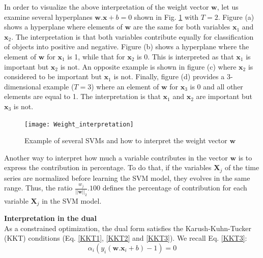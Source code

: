 In order to visualize the above interpretation of the weight vector $\textbf{w}$, let us examine several hyperplanes $\textbf{w}.\textbf{x}+b=0$ shown in Fig. \ref*{fig:Weight_interpretation} with $T=2$. Figure (a) shows a hyperplane where elements of $\textbf{w}$ are the same for both variables $\textbf{x}_1$ and $\textbf{x}_2$. The interpretation is that both variables contribute equally for classification of objects into positive and negative. Figure (b) shows a hyperplane where the element of $\textbf{w}$ for $\textbf{x}_1$ is 1, while that for $\textbf{x}_2$ is 0. This is interpreted as that $\textbf{x}_1$ is important but $\textbf{x}_2$ is not. An opposite example is shown in figure (c) where $\textbf{x}_2$ is considered to be important but $\textbf{x}_1$ is not. Finally, figure (d) provides a 3-dimensional example ($T=3$) where an element of $\textbf{w}$ for $\textbf{x}_3$ is 0 and all other elements are equal to 1. The interpretation is that $\textbf{x}_1$ and $\textbf{x}_2$ are important but $\textbf{x}_3$ is not.
\begin{figure}[h!]
	\centering
	\texttt{[image: Weight\_interpretation]}
	\caption{Example of several SVMs and how to interpret the weight vector $\textbf{w}$}
	\label{fig:Weight_interpretation}
\end{figure}

Another way to interpret how much a variable contributes in the vector $\textbf{w}$ is to express the contribution in percentage. To do that, if the variables $\textbf{X}_j$ of the time series are normalized before learning the SVM model, they evolves in the same range. Thus, the ratio $\frac{w_j}{||\textbf{w}||_2} . 100$ defines the percentage of contribution for each variable $\textbf{X}_j$ in the SVM model.




\noindent \textbf{Interpretation in the dual} \\
As a constrained optimization, the dual form satisfies the
Karush-Kuhn-Tucker (KKT) conditions (Eq. \ref{KKT1}, \ref{KKT2} and \ref{KKT3}). We recall Eq. \ref{KKT3}:
\begin{equation*}
	\alpha_i (y_i(\textbf{w}.\textbf{x}_i+b)-1) = 0
\end{equation*}

